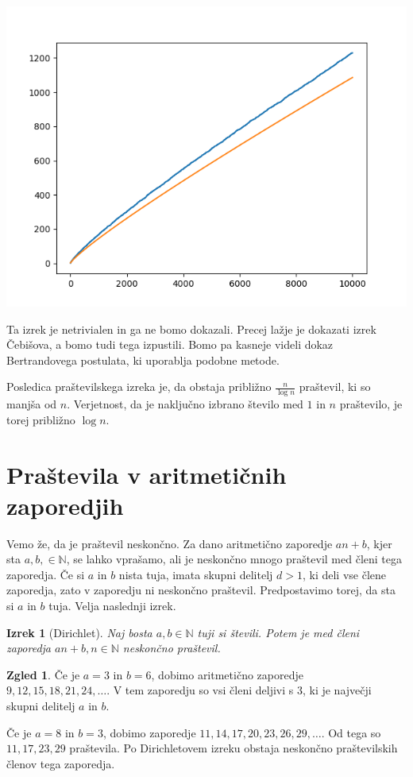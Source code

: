 \documentclass[a4paper,12pt]{article}
\def\N{\mathbb{N}}
\theoremstyle{definition}
\newtheorem{zgled}{Zgled}
\theoremstyle{plain}
\newtheorem{izrek}{Izrek}
\begin{document}
\begin{center}
    \includegraphics[scale=0.8]{graf1.png}
\end{center}

Ta izrek je netrivialen in ga ne bomo dokazali. Precej lažje je dokazati izrek Čebišova, a bomo tudi tega izpustili. Bomo pa kasneje videli dokaz Bertrandovega postulata, ki uporablja podobne metode.

Posledica praštevilskega izreka je, da obstaja približno $\frac{n}{\log{n}}$ praštevil, ki so manjša od $n$. Verjetnost, da je naključno izbrano število med $1$ in $n$ praštevilo, je torej približno $\log{n}$.




\section{Praštevila v aritmetičnih zaporedjih}
Vemo že, da je praštevil neskončno. Za dano aritmetično zaporedje $an + b$, kjer sta $a, b, \in \N$, se lahko vprašamo, ali je neskončno mnogo praštevil med členi tega zaporedja. Če si $a$ in $b$ nista tuja, imata skupni delitelj $d > 1$, ki deli vse člene zaporedja, zato v zaporedju ni neskončno praštevil. Predpostavimo torej, da sta si $a$ in $b$ tuja. Velja naslednji izrek.

\begin{izrek}[Dirichlet]
    Naj bosta $a, b \in \N$ tuji si števili. Potem je med členi zaporedja $an + b, n \in \N$ neskončno praštevil.
\end{izrek}

\begin{zgled}
    Če je $a = 3$ in $b = 6$, dobimo aritmetično zaporedje $9, 12, 15, 18, 21, 24, \ldots$. V tem zaporedju so vsi členi deljivi s $3$, ki je največji skupni delitelj $a$ in $b$.
    
    Če je $a = 8$ in $b = 3$, dobimo zaporedje $11, 14, 17, 20, 23, 26, 29, \ldots$. Od tega so $11, 17, 23, 29$ praštevila. Po Dirichletovem izreku obstaja neskončno praštevilskih členov tega zaporedja.
\end{zgled}
\end{document}
